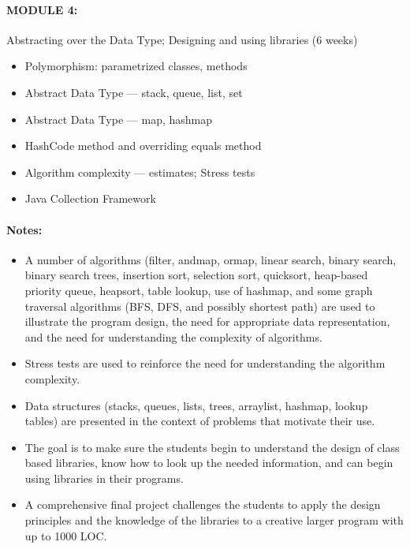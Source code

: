 \documentclass[11pt]{article}
\begin{document}
\paragraph{MODULE 4:}
%
Abstracting over the Data Type; Designing and using libraries (6 weeks)
%
\begin{itemize}
\item Polymorphism: parametrized classes, methods
\item Abstract Data Type --- stack, queue, list, set
\item Abstract Data Type --- map, hashmap
\item HashCode method and overriding equals method
\item Algorithm complexity --- estimates; Stress tests
\item Java Collection Framework
\end{itemize}

\paragraph{Notes:}
%
\begin{itemize}

\item A number of algorithms (filter, andmap, ormap, linear search, binary search, binary search trees, insertion sort, selection sort, quicksort, heap-based priority queue, heapsort, table lookup, use of hashmap, and some graph traversal algorithms (BFS, DFS, and possibly shortest path) are used to illustrate the program design, the need for appropriate data representation, and the need for understanding the complexity of algorithms.

\item Stress tests are used to reinforce the need for understanding the algorithm complexity.

\item Data structures (stacks, queues, lists, trees, arraylist, hashmap, lookup tables) are presented in the context of problems that motivate their use.

\item The goal is to make sure the students begin to understand the design of class based libraries, know how to look up the needed information, and can begin using libraries in their programs.

\item A comprehensive final project challenges the students to apply the design principles and the knowledge of the libraries to a creative larger program with up to 1000 LOC.

\end{itemize}
\end{document}
